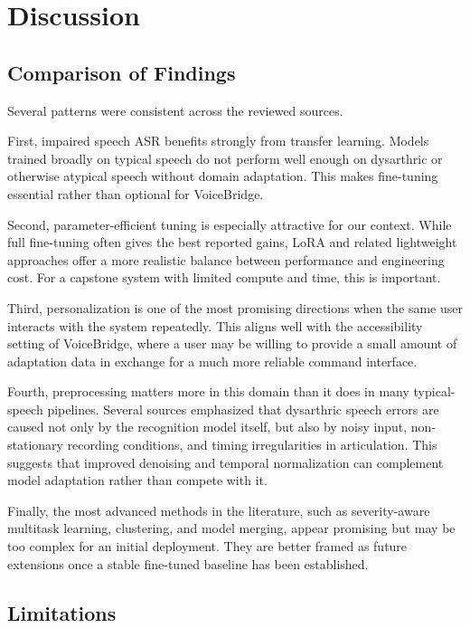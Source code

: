 \documentclass{article}
\begin{document}
\section{Discussion}

\subsection{Comparison of Findings}

Several patterns were consistent across the reviewed sources.

First, impaired speech ASR benefits strongly from transfer learning. Models trained broadly on typical speech do not perform well enough on dysarthric or otherwise atypical speech without domain adaptation. This makes fine-tuning essential rather than optional for VoiceBridge.

Second, parameter-efficient tuning is especially attractive for our context. While full fine-tuning often gives the best reported gains, LoRA and related lightweight approaches offer a more realistic balance between performance and engineering cost. For a capstone system with limited compute and time, this is important.

Third, personalization is one of the most promising directions when the same user interacts with the system repeatedly. This aligns well with the accessibility setting of VoiceBridge, where a user may be willing to provide a small amount of adaptation data in exchange for a much more reliable command interface.

Fourth, preprocessing matters more in this domain than it does in many typical-speech pipelines. Several sources emphasized that dysarthric speech errors are caused not only by the recognition model itself, but also by noisy input, non-stationary recording conditions, and timing irregularities in articulation. This suggests that improved denoising and temporal normalization can complement model adaptation rather than compete with it.

Finally, the most advanced methods in the literature, such as severity-aware multitask learning, clustering, and model merging, appear promising but may be too complex for an initial deployment. They are better framed as future extensions once a stable fine-tuned baseline has been established.

\subsection{Limitations}
\end{document}
